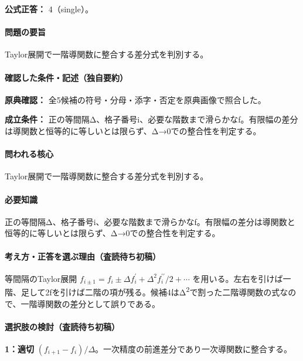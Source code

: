\textbf{公式正答：} 4（single）。

\paragraph{問題の要旨} Taylor展開で一階導関数に整合する差分式を判別する。

\paragraph{確認した条件・記述（独自要約）}\mbox{}\par

\noindent\textbf{原典確認：} 全5候補の符号・分母・添字・否定を原典画像で照合した。\par

\noindent\textbf{成立条件：} 正の等間隔Δ、格子番号i、必要な階数まで滑らかなf。有限幅の差分は導関数と恒等的に等しいとは限らず、Δ→0での整合性を判定する。\par

\paragraph{問われる核心} Taylor展開で一階導関数に整合する差分式を判別する。

\paragraph{必要知識} 正の等間隔Δ、格子番号i、必要な階数まで滑らかなf。有限幅の差分は導関数と恒等的に等しいとは限らず、Δ→0での整合性を判定する。

\paragraph{考え方・正答を選ぶ理由（査読待ち初稿）} 等間隔のTaylor展開 \(f_{i\pm1}=f_i\pm\Delta f_i^\prime+\Delta^2f_i^{\prime\prime}/2+\cdots\) を用いる。左右を引けば一階、足して2fを引けば二階の項が残る。候補4はΔ\textsuperscript{2}で割った二階導関数の式なので、一階導関数の差分として誤りである。

\paragraph{選択肢の検討（査読待ち初稿）}\mbox{}\par

\noindent\textbf{1：適切} \((f_{i+1}-f_i)/\Delta\)。一次精度の前進差分であり一次導関数に整合する。\par

